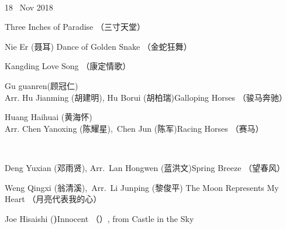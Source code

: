 \documentclass[letter,6pt,poets]{ConcProg}
\begin{document}
\begin{spacing}{0.85}
\begin{programme}{
\\  {\normalsize 18 ~Nov 2018}
}
\begin{part}[]
\begin{composition}{}{}{Three Inches of Paradise  （三寸天堂）}{}
    \end{composition}
    \begin{composition}{Nie Er (聂耳)} {}{Dance of Golden Snake  （金蛇狂舞）}{}
    \end{composition}
    \begin{composition}{}{}{Kangding Love Song  （康定情歌）}{}
    \end{composition}
    \begin{composition}{Gu guanren(顾冠仁)\\ Arr. Hu Jianming (胡建明), Hu Borui (胡柏瑞)}{}{Galloping Horses  （骏马奔驰）}{}
    \end{composition}
    \begin{composition}{Huang Haihuai (黄海怀)\\ Arr. Chen Yanoxing (陈耀星),\  Chen Jun (陈军)}{}{Racing Horses  （赛马）}{}
    \end{composition}\\
    \begin{composition}{Deng Yuxian (邓雨贤), Arr.\ Lan Hongwen (蓝洪文)}{}{Spring Breeze  （望春风）}{}
    \end{composition}
    \begin{composition}{Weng Qingxi (翁清溪),\ Arr.\ Li Junping (黎俊平) }{}{The Moon Represents My Heart  （月亮代表我的心）}{}
    \end{composition}
    \begin{composition}{Joe Hisaishi (\textbf{)}}{}{Innocent （）, from Castle in the Sky }{}
                   {}{}
    \end{composition}
    
    



\end{part}
\end{programme}
\end{spacing}
\end{document}
